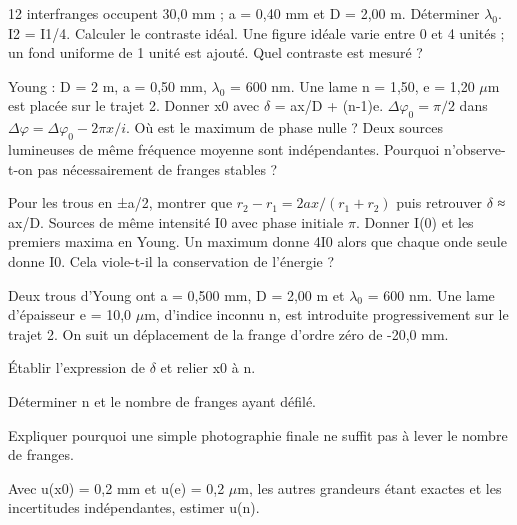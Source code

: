 12 interfranges occupent 30,0 mm ; a = 0,40 mm et D = 2,00 m. Déterminer \ensuremath{\lambda_0}.
I2 = I1/4. Calculer le contraste idéal.
Une figure idéale varie entre 0 et 4 unités ; un fond uniforme de 1 unité est ajouté. Quel contraste est mesuré ?


Young : D = 2 m, a = 0,50 mm, \ensuremath{\lambda_0} = 600 nm. Une lame n = 1,50, e = 1,20 \ensuremath{\mu}m est placée sur le trajet 2. Donner x0 avec \ensuremath{\delta} = ax/D + (n-1)e.
$\Delta\varphi_0=\pi/2$ dans $\Delta\varphi=\Delta\varphi_0-2\pi x/i$. Où est le maximum de phase nulle ?
Deux sources lumineuses de même fréquence moyenne sont indépendantes. Pourquoi n’observe-t-on pas nécessairement de franges stables ?


Pour les trous en ±a/2, montrer que $r_2-r_1=2ax/(r_1+r_2)$ puis retrouver \ensuremath{\delta} ≈ ax/D.
Sources de même intensité I0 avec phase initiale \ensuremath{\pi}. Donner I(0) et les premiers maxima en Young.
Un maximum donne 4I0 alors que chaque onde seule donne I0. Cela viole-t-il la conservation de l’énergie ?


\label{ch09-ex-D1}
Deux trous d’Young ont a = 0,500 mm, D = 2,00 m et \ensuremath{\lambda_0} = 600 nm. Une lame d’épaisseur e = 10,0 \ensuremath{\mu}m, d’indice inconnu n, est introduite progressivement sur le trajet 2. On suit un déplacement de la frange d’ordre zéro de -20,0 mm.\begin{questions}
\item Établir l’expression de \ensuremath{\delta} et relier x0 à n.
\item Déterminer n et le nombre de franges ayant défilé.
\item Expliquer pourquoi une simple photographie finale ne suffit pas à lever le nombre de franges.
\item Avec u(x0) = 0,2 mm et u(e) = 0,2 \ensuremath{\mu}m, les autres grandeurs étant exactes et les incertitudes indépendantes, estimer u(n).
\end{questions}


